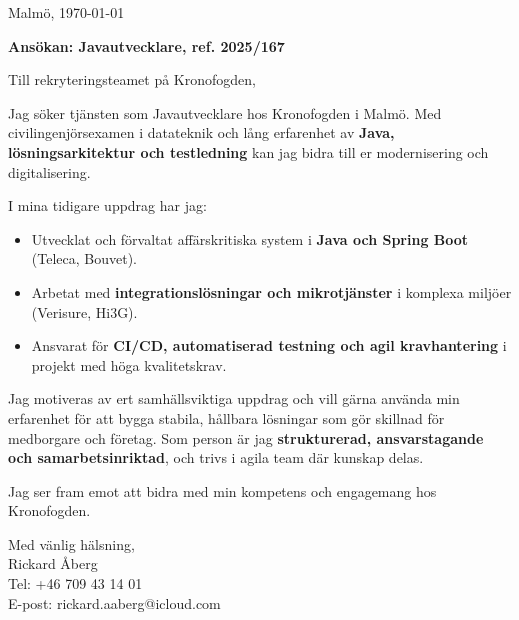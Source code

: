 \documentclass[a4paper,11pt]{article}
\begin{document}
\begin{flushright}
Malmö, \today
\end{flushright}

\vspace{1em}

\textbf{Ansökan: Javautvecklare, ref. 2025/167}

\vspace{1em}

Till rekryteringsteamet på Kronofogden,

Jag söker tjänsten som Javautvecklare hos Kronofogden i Malmö. 
Med civilingenjörsexamen i datateknik och lång erfarenhet av \textbf{Java, lösningsarkitektur och testledning} kan jag bidra till er modernisering och digitalisering.

I mina tidigare uppdrag har jag:
\begin{itemize}
  \item Utvecklat och förvaltat affärskritiska system i \textbf{Java och Spring Boot} (Teleca, Bouvet).
  \item Arbetat med \textbf{integrationslösningar och mikrotjänster} i komplexa miljöer (Verisure, Hi3G).
  \item Ansvarat för \textbf{CI/CD, automatiserad testning och agil kravhantering} i projekt med höga kvalitetskrav.
\end{itemize}

Jag motiveras av ert samhällsviktiga uppdrag och vill gärna använda min erfarenhet för att bygga stabila, hållbara lösningar som gör skillnad för medborgare och företag. 
Som person är jag \textbf{strukturerad, ansvarstagande och samarbetsinriktad}, och trivs i agila team där kunskap delas.

Jag ser fram emot att bidra med min kompetens och engagemang hos Kronofogden.

\vspace{1em}

Med vänlig hälsning, \\
\vspace{2em}
Rickard Åberg \\
Tel: +46 709 43 14 01 \\
E-post: rickard.aaberg@icloud.com
\end{document}
